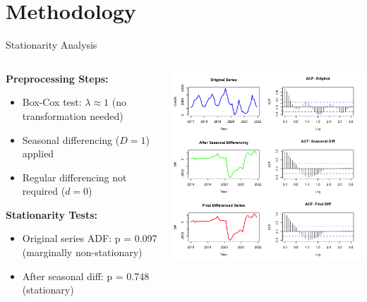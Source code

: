 \documentclass[10pt]{beamer}
\begin{document}
\section{Methodology}

\begin{frame}{Stationarity Analysis}
\begin{columns}
\begin{column}{0.45\textwidth}
\textbf{Preprocessing Steps:}
\begin{itemize}
\item Box-Cox test: $\lambda \approx 1$ (no transformation needed)
\item Seasonal differencing ($D=1$) applied
\item Regular differencing not required ($d=0$)
\end{itemize}

\vspace{0.3cm}
\textbf{Stationarity Tests:}
\begin{itemize}
\item Original series ADF: p = 0.097 (marginally non-stationary)
\item After seasonal diff: p = 0.748 (stationary)

\end{itemize}
\end{column}

\begin{column}{0.55\textwidth}
\includegraphics[width=\textwidth,height=0.85\textheight,keepaspectratio]{plots/dif-analysis.png}
\end{column}
\end{columns}
\end{frame}
\end{document}
